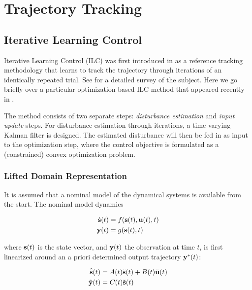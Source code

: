 \chapter{Trajectory Tracking} \label{Chapter1}


\section{Iterative Learning Control} \label{ILC}

Iterative Learning Control (ILC) was first introduced in \cite{Arimoto} as a reference tracking methodology that learns to track the trajectory through iterations of an identically repeated trial.
See \cite{Survey} for a detailed survey of the subject. Here we go briefly over a particular optimization-based ILC method that appeared recently in \cite{ILC_Angela}.

The method consists of two separate steps: \emph{disturbance estimation} and \emph{input update} steps. For disturbance estimation through iterations, a time-varying Kalman filter is designed. The estimated disturbance will then be fed in as input to the optimization step, where the control objective is formulated as a (constrained) convex optimization problem. 

\subsection{Lifted Domain Representation}\label{LiftedDomain}

It is assumed that a nominal model of the dynamical systems is available from the start. The nominal model dynamics

\begin{align}
\dot{\mathbf{s}}(t) &= f(\mathbf{s}(t), \mathbf{u}(t), t) \\
\mathbf{y}(t)       &= g(\mathbf{s}(t), t)
\end{align}

where $\mathbf{s}(t)$ is the state vector, and $\mathbf{y}(t)$ the observation at time $t$, is first linearized around an a priori determined output trajectory $\mathbf{y}^{*}(t)$:

\begin{align}
\dot{\tilde{\mathbf{s}}}(t) &= A(t)\tilde{\mathbf{s}}(t) + B(t)\tilde{\mathbf{u}}(t) \label{linX} \\
\tilde{\mathbf{y}}(t) &= C(t)\tilde{\mathbf{s}}(t) \label{linY}
\end{align}

